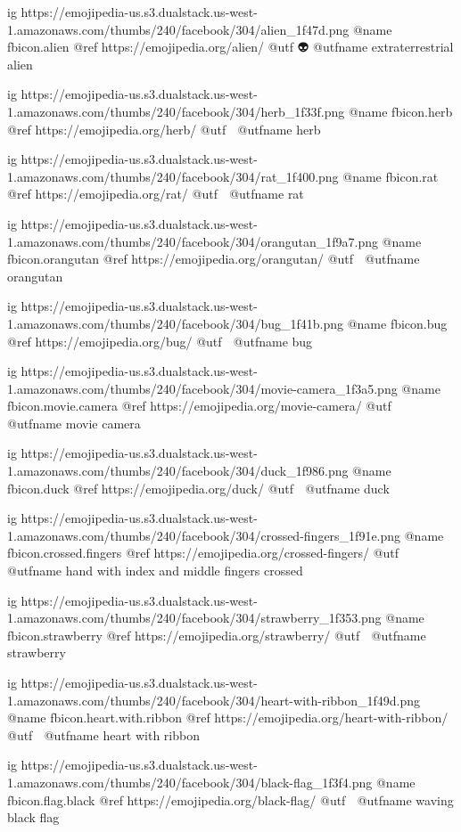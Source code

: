 	ig https://emojipedia-us.s3.dualstack.us-west-1.amazonaws.com/thumbs/240/facebook/304/alien_1f47d.png
	@name fbicon.alien
	@ref https://emojipedia.org/alien/
	@utf 👽
	@utfname extraterrestrial alien

	ig https://emojipedia-us.s3.dualstack.us-west-1.amazonaws.com/thumbs/240/facebook/304/herb_1f33f.png
	@name fbicon.herb
	@ref https://emojipedia.org/herb/
	@utf 🌿
	@utfname herb

	ig https://emojipedia-us.s3.dualstack.us-west-1.amazonaws.com/thumbs/240/facebook/304/rat_1f400.png
	@name fbicon.rat
	@ref https://emojipedia.org/rat/
	@utf 🐀
	@utfname rat

	ig https://emojipedia-us.s3.dualstack.us-west-1.amazonaws.com/thumbs/240/facebook/304/orangutan_1f9a7.png
	@name fbicon.orangutan
	@ref https://emojipedia.org/orangutan/
	@utf 🦧
	@utfname orangutan

	ig https://emojipedia-us.s3.dualstack.us-west-1.amazonaws.com/thumbs/240/facebook/304/bug_1f41b.png
	@name fbicon.bug
	@ref https://emojipedia.org/bug/
	@utf 🐛
	@utfname bug

	ig https://emojipedia-us.s3.dualstack.us-west-1.amazonaws.com/thumbs/240/facebook/304/movie-camera_1f3a5.png
	@name fbicon.movie.camera
	@ref https://emojipedia.org/movie-camera/
	@utf 🎥
	@utfname movie camera

	ig https://emojipedia-us.s3.dualstack.us-west-1.amazonaws.com/thumbs/240/facebook/304/duck_1f986.png
	@name fbicon.duck
	@ref https://emojipedia.org/duck/
	@utf 🦆
	@utfname duck

	ig https://emojipedia-us.s3.dualstack.us-west-1.amazonaws.com/thumbs/240/facebook/304/crossed-fingers_1f91e.png
	@name fbicon.crossed.fingers
	@ref https://emojipedia.org/crossed-fingers/
	@utf 🤞
	@utfname hand with index and middle fingers crossed

	ig https://emojipedia-us.s3.dualstack.us-west-1.amazonaws.com/thumbs/240/facebook/304/strawberry_1f353.png
	@name fbicon.strawberry
	@ref https://emojipedia.org/strawberry/
	@utf 🍓
	@utfname strawberry

	ig https://emojipedia-us.s3.dualstack.us-west-1.amazonaws.com/thumbs/240/facebook/304/heart-with-ribbon_1f49d.png
	@name fbicon.heart.with.ribbon
	@ref https://emojipedia.org/heart-with-ribbon/
	@utf 💝
	@utfname heart with ribbon

	ig https://emojipedia-us.s3.dualstack.us-west-1.amazonaws.com/thumbs/240/facebook/304/black-flag_1f3f4.png
	@name fbicon.flag.black
	@ref https://emojipedia.org/black-flag/
	@utf 🏴
	@utfname waving black flag

